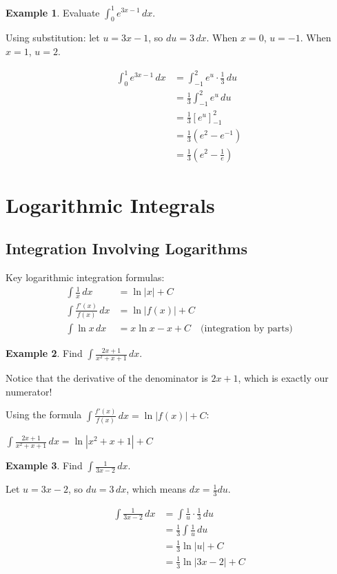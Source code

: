 \documentclass[12pt,a4paper]{book}
\theoremstyle{definition}
\newtheorem{example}{Example}[chapter]
\begin{document}
\begin{example}
Evaluate $\int_0^1 e^{3x-1} \, dx$.

Using substitution: let $u = 3x - 1$, so $du = 3 \, dx$.
When $x = 0$, $u = -1$. When $x = 1$, $u = 2$.

\begin{align}
\int_0^1 e^{3x-1} \, dx &= \int_{-1}^2 e^u \cdot \frac{1}{3} \, du\\
&= \frac{1}{3} \int_{-1}^2 e^u \, du\\
&= \frac{1}{3} [e^u]_{-1}^2\\
&= \frac{1}{3}(e^2 - e^{-1})\\
&= \frac{1}{3}\left(e^2 - \frac{1}{e}\right)
\end{align}
\end{example}

\section{Logarithmic Integrals}

\subsection{Integration Involving Logarithms}

\begin{keyformula}
Key logarithmic integration formulas:
\begin{align}
\int \frac{1}{x} \, dx &= \ln|x| + C\\
\int \frac{f'(x)}{f(x)} \, dx &= \ln|f(x)| + C\\
\int \ln x \, dx &= x\ln x - x + C \quad \text{(integration by parts)}
\end{align}
\end{keyformula}

\begin{example}
Find $\int \frac{2x + 1}{x^2 + x + 1} \, dx$.

Notice that the derivative of the denominator is $2x + 1$, which is exactly our numerator!

Using the formula $\int \frac{f'(x)}{f(x)} \, dx = \ln|f(x)| + C$:

$\int \frac{2x + 1}{x^2 + x + 1} \, dx = \ln|x^2 + x + 1| + C$
\end{example}

\begin{example}
Find $\int \frac{1}{3x - 2} \, dx$.

Let $u = 3x - 2$, so $du = 3 \, dx$, which means $dx = \frac{1}{3} du$.

\begin{align}
\int \frac{1}{3x - 2} \, dx &= \int \frac{1}{u} \cdot \frac{1}{3} \, du\\
&= \frac{1}{3} \int \frac{1}{u} \, du\\
&= \frac{1}{3} \ln|u| + C\\
&= \frac{1}{3} \ln|3x - 2| + C
\end{align}
\end{example}
\end{document}

